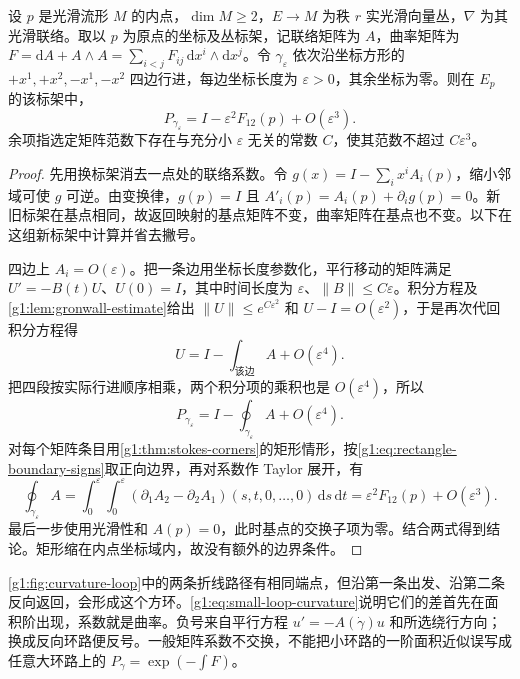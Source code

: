 \begin{proposition}\label{g1:prop:small-loop-curvature}
	设 \(p\) 是光滑流形 \(M\) 的内点，\(\dim M\geq2\)，\(E\to M\) 为秩 \(r\) 实光滑向量丛，\(\nabla\) 为其光滑联络。取以 \(p\) 为原点的坐标及丛标架，记联络矩阵为 \(A\)，曲率矩阵为 \(F=\mathrm{d}A+A\wedge A=\sum_{i<j}F_{ij}\,\mathrm{d}x^i\wedge\mathrm{d}x^j\)。令 \(\gamma_\varepsilon\) 依次沿坐标方形的 \(+x^1,+x^2,-x^1,-x^2\) 四边行进，每边坐标长度为 \(\varepsilon>0\)，其余坐标为零。则在 \(E_p\) 的该标架中，
	\begin{equation}\label{g1:eq:small-loop-curvature}
		P_{\gamma_\varepsilon}
		=I-\varepsilon^2F_{12}(p)+O(\varepsilon^3).
	\end{equation}
	余项指选定矩阵范数下存在与充分小 \(\varepsilon\) 无关的常数 \(C\)，使其范数不超过 \(C\varepsilon^3\)。
\end{proposition}
\begin{proof}
	先用换标架消去一点处的联络系数。令 \(g(x)=I-\sum_i x^iA_i(p)\)，缩小邻域可使 \(g\) 可逆。由变换律，\(g(p)=I\) 且 \(A'_i(p)=A_i(p)+\partial_i g(p)=0\)。新旧标架在基点相同，故返回映射的基点矩阵不变，曲率矩阵在基点也不变。以下在这组新标架中计算并省去撇号。

	四边上 \(A_i=O(\varepsilon)\)。把一条边用坐标长度参数化，平行移动的矩阵满足 \(U'=-B(t)U\)、\(U(0)=I\)，其中时间长度为 \(\varepsilon\)、\(\|B\|\leq C\varepsilon\)。积分方程及\cref{g1:lem:gronwall-estimate}给出 \(\|U\|\leq e^{C\varepsilon^2}\) 和 \(U-I=O(\varepsilon^2)\)，于是再次代回积分方程得
	\[
		U=I-\int_{\text{该边}}A+O(\varepsilon^4).
	\]
	把四段按实际行进顺序相乘，两个积分项的乘积也是 \(O(\varepsilon^4)\)，所以
	\[
		P_{\gamma_\varepsilon}=I-\oint_{\gamma_\varepsilon}A+O(\varepsilon^4).
	\]
	对每个矩阵条目用\cref{g1:thm:stokes-corners}的矩形情形，按\eqref{g1:eq:rectangle-boundary-signs}取正向边界，再对系数作 Taylor 展开，有
	\[
		\oint_{\gamma_\varepsilon}A
		=\int_0^\varepsilon\int_0^\varepsilon
		(\partial_1A_2-\partial_2A_1)(s,t,0,\ldots,0)\,\mathrm{d}s\,\mathrm{d}t
		=\varepsilon^2F_{12}(p)+O(\varepsilon^3).
	\]
	最后一步使用光滑性和 \(A(p)=0\)，此时基点的交换子项为零。结合两式得到结论。矩形缩在内点坐标域内，故没有额外的边界条件。
\end{proof}



\cref{g1:fig:curvature-loop}中的两条折线路径有相同端点，但沿第一条出发、沿第二条反向返回，会形成这个方环。\eqref{g1:eq:small-loop-curvature}说明它们的差首先在面积阶出现，系数就是曲率。负号来自平行方程 \(u'=-A(\dot\gamma)u\) 和所选绕行方向；换成反向环路便反号。一般矩阵系数不交换，不能把小环路的一阶面积近似误写成任意大环路上的 \(P_\gamma=\exp(-\int F)\)。

